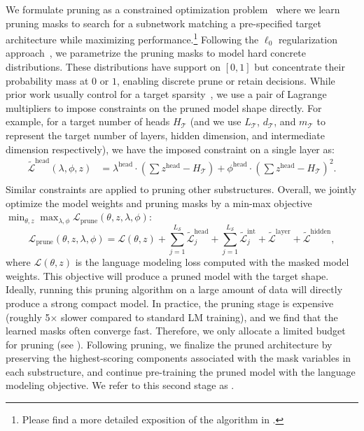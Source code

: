 We formulate pruning as a constrained optimization problem~\citep{platt1987constrained} 
where we learn pruning masks to search for a subnetwork 
matching a pre-specified target architecture 
while maximizing performance.\footnote{Please find a more detailed exposition of the algorithm in .}
Following the $\ell_0$ regularization approach~\citep{louizos2018learning}, we parametrize the pruning masks to model hard concrete distributions. These distributions have support on $[0,1]$ but concentrate their probability mass at $0$ or $1$, enabling discrete prune or retain decisions. 
While prior work usually control for a target sparsity~\citep{wang2020structured,xia-etal-2022-structured}, we use a pair of Lagrange multipliers to impose constraints on the pruned model shape directly. 
For example, for a target number of heads $H_\mathcal{T}$ (and we use $L_\mathcal{T}$, $d_\mathcal{T}$, and $m_\mathcal{T}$ to represent the target number of layers, hidden dimension, and intermediate dimension respectively), we have the imposed constraint on a single layer as:
\begin{align*}
    \tilde{\mathcal{L}}^{\mathrm{head}}( \lambda, \phi, z) & = \lambda^{\mathrm{head}} \cdot \left(\sum{{z}^{\mathrm{head}}} - H_{\mathcal{T}}\right) + \phi^{\mathrm{head}} \cdot \left(\sum{{z}^{\mathrm{head}}} - H_{\mathcal{T}}\right)^2. \\
\end{align*}
Similar constraints are applied to pruning other substructures. Overall, we jointly optimize the model weights and pruning masks by a min-max objective $\min_{\theta, {z}} \max_{\lambda, \phi} \mathcal{L}_{\mathrm{prune}}(\theta, z, \lambda, \phi)$: %
\
\begin{equation}
    \mathcal{L}_{\mathrm{prune}}(\theta, z, \lambda, \phi) = \mathcal{L}(\theta, {z}) + \sum_{j=1}^{L_{\mathcal{S}}} \tilde{\mathcal{L}}^{\mathrm{head}}_{j} + \sum_{j=1}^{L_{\mathcal{S}}}  \tilde{\mathcal{L}} ^{\mathrm{int}}_{j} + \tilde{\mathcal{L}}^{\mathrm{layer}} + \tilde{\mathcal{L}}^{\mathrm{hidden}},
    \label{eq:pruning}
    \nonumber
\end{equation}
where $\mathcal{L}(\theta, {z})$ is the language modeling loss computed with the masked model weights.
This objective will produce a  pruned model with the target shape.
Ideally, 
running this pruning algorithm 
on a large amount of data will directly produce a strong compact model.
In practice, the pruning stage is expensive (roughly 5$\times$ slower compared to standard LM training), and we find
that the learned masks often converge fast.
Therefore, %
we only allocate a limited budget for pruning (see ). Following pruning, we finalize the pruned architecture by preserving the highest-scoring components associated with the mask variables in each substructure,
and continue pre-training the pruned model with the language modeling objective. 
We refer to this second stage as \ct{}. 

